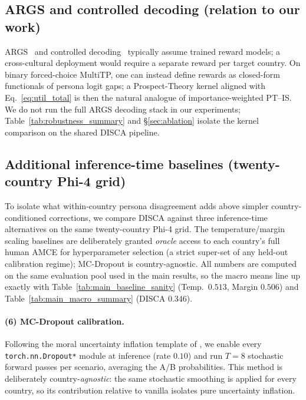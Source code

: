 \documentclass{article}
\begin{document}
\subsection{ARGS and controlled decoding (relation to our work)}
\label{app:baselines:args}

ARGS~\citep{khanov2024args} and controlled decoding~\citep{mudgal2024controlled} typically assume trained reward models; a cross-cultural deployment would require a separate reward per target country. On binary forced-choice MultiTP, one can instead define rewards as closed-form functionals of persona logit gaps; a Prospect-Theory kernel aligned with Eq.~\ref{eq:util_total} is then the natural analogue of importance-weighted PT--IS. We do not run the full ARGS decoding stack in our experiments; Table~\ref{tab:robustness_summary} and \S\ref{sec:ablation} isolate the kernel comparison on the shared DISCA pipeline.

\subsection{Additional inference-time baselines (twenty-country Phi-4 grid)}
\label{app:baselines:additional}

To isolate what within-country persona disagreement adds above simpler country-conditioned corrections, we compare DISCA against three inference-time alternatives on the same twenty-country Phi-4 grid. The temperature/margin scaling baselines are deliberately granted \emph{oracle} access to each country's full human AMCE for hyperparameter selection (a strict super-set of any held-out calibration regime); MC-Dropout is country-agnostic. All numbers are computed on the same evaluation pool used in the main results, so the macro means line up exactly with Table~\ref{tab:main_baseline_sanity} (Temp.\ $0.513$, Margin $0.506$) and Table~\ref{tab:main_macro_summary} (DISCA $0.346$).

\paragraph{(6) MC-Dropout calibration.} Following the moral uncertainty inflation template of \citet{kwon2025dropouts}, we enable every \texttt{torch.nn.Dropout*} module at inference (rate $0.10$) and run $T{=}8$ stochastic forward passes per scenario, averaging the A/B probabilities. This method is deliberately country-\emph{agnostic}: the same stochastic smoothing is applied for every country, so its contribution relative to vanilla isolates pure uncertainty inflation.
\end{document}
